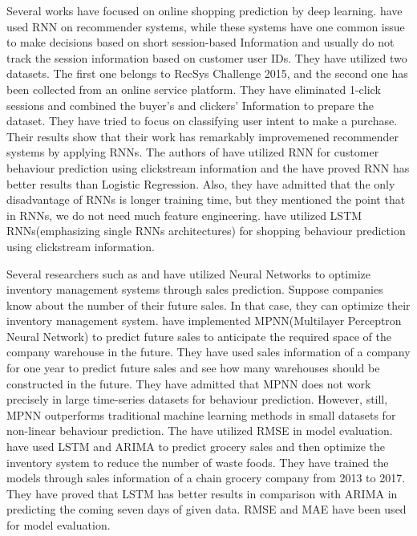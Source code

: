 \documentclass[conference]{IEEEtran}
\begin{document}
\par Several works have focused on online shopping prediction by deep learning. \cite{hidasi2015session} have used RNN on recommender systems, while these systems have one common issue to make decisions based on short session-based Information and usually do not track the session information based on customer user IDs. They have utilized two datasets. The first one belongs to RecSys Challenge 2015, and the second one has been collected from an online service platform. They have eliminated 1-click sessions and combined the buyer's and clickers' Information to prepare the dataset.  They have tried to focus on classifying user intent to make a purchase. Their results show that their work has remarkably improvemened recommender systems by applying RNNs. The authors of \cite{lang2017understanding} have utilized RNN for customer behaviour prediction using clickstream information and the have proved RNN has better results than Logistic Regression. Also, they have admitted that the only disadvantage of RNNs is longer training time, but they mentioned the point that in RNNs, we do not need much feature engineering. \cite{toth2017predicting} have utilized LSTM RNNs(emphasizing single RNNs architectures) for shopping behaviour prediction using clickstream information.  

\par Several researchers such as \cite{croda2019sales} and \cite{elmasdotter2018comparative} have utilized Neural Networks to optimize inventory management systems through sales prediction. Suppose companies know about the number of their future sales. In that case, they can optimize their inventory management system. \cite{croda2019sales} have implemented MPNN(Multilayer Perceptron Neural Network) to predict future sales to anticipate the required space of the company warehouse in the future. They have used sales information of a company for one year to predict future sales and see how many warehouses should be constructed in the future. They have admitted that MPNN does not work precisely in large time-series datasets for behaviour prediction. However, still, MPNN outperforms traditional machine learning methods in small datasets for non-linear behaviour prediction. The have utilized RMSE in model evaluation. \cite{elmasdotter2018comparative} have used LSTM and ARIMA to predict grocery sales and then optimize the inventory system to reduce the number of waste foods. They have trained the models through sales information of a chain grocery company from 2013 to 2017. They have proved that LSTM has better results in comparison with ARIMA in predicting the coming seven days of given data. RMSE and MAE have been used for model evaluation. 
\end{document}
